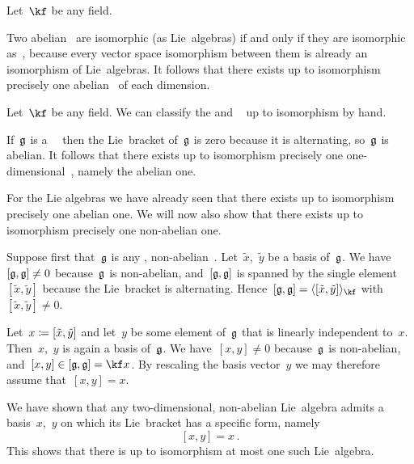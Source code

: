 \begin{example}
  Let~$\kf$ be any field.

  Two abelian~{\liealgebras{$\kf$}} are isomorphic (as Lie~algebras) if and only if they are isomorphic as~{\vectorspaces{$\kf$}}, because every vector space isomorphism between them is already an isomorphism of Lie~algebras.
  It follows that there exists up to isomorphism precisely one abelian~{\liealgebra{$\kf$}} of each dimension.
\end{example}


\begin{example}
  Let~$\kf$ be any field.
  We can classify the {\onedimensional} and {\twodimensional}~\liealgebras{$\kf$} up to isomorphism by hand.
  
  If~$\mathfrak{g}$ is a~{\onedimensional}~\liealgebra{$\kf$} then the Lie~bracket of~$\mathfrak{g}$ is zero because it is alternating, so~$\mathfrak{g}$ is abelian.
  It follows that there exists up to isomorphism precisely one one-dimensional~\liealgebra{$\kf$}, namely the abelian one.
 
  For the {\twodimensional} Lie algebras we have already seen that there exists up to isomorphism precisely one abelian one.
  We will now also show that there exists up to isomorphism precisely one non-abelian one.
  
  Suppose first that~$\mathfrak{g}$ is any {\twodimensional}, non-abelian~\liealgebra{$\kf$}.
  Let~$\tilde{x}$,~$\tilde{y}$ be a basis of~$\mathfrak{g}$.
  We have~$[\mathfrak{g}, \mathfrak{g}] \neq 0$ because~$\mathfrak{g}$ is non-abelian, and~$[\mathfrak{g}, \mathfrak{g}]$ is spanned by the single element~$[\tilde{x}, \tilde{y}]$ because the Lie~bracket is alternating.
  Hence~$[\glie, \glie] = \gen{ [\tilde{x}, \tilde{y}] }_{\kf}$ with~$[\tilde{x}, \tilde{y}] \neq 0$.

  Let~$x \coloneqq [\tilde{x},\tilde{y}]$ and let~$y$ be some element of~$\mathfrak{g}$ that is linearly independent to~$x$.
  Then~$x$,~$y$ is again a basis of~$\mathfrak{g}$.
  We have~$[x,y] \neq 0$ because~$\mathfrak{g}$ is non-abelian, and~$[x,y] \in [\glie, \glie] = \kf x$.
  By rescaling the basis vector~$y$ we may therefore assume that~$[x,y] = x$.

  We have shown that any two-dimensional, non-abelian Lie~algebra admits a basis~$x$,~$y$ on which its Lie~bracket has a specific form, namely
  \[
    [x,y] = x \,.
  \]
  This shows that there is up to isomorphism at most one such Lie~algebra.
 

\end{example}
